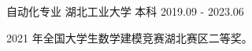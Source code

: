 

\begin{cventries}

  \cventry
    {自动化专业} %
    {湖北工业大学} %
    {本科} %
    {2019.09 - 2023.06} %
    {
      \begin{cvitems} %
        \item {2021 年全国大学生数学建模竞赛湖北赛区二等奖。 }
      \end{cvitems}
    }
  
\end{cventries}
